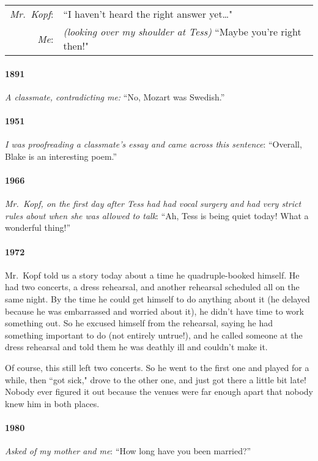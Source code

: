 \documentclass[10pt]{memoir}
\newcommand{\speakertag}[1]{\emph{#1}: }
\newcommand{\st}{\speakertag}
\newcommand{\intro}[1]{\emph{#1}}
\begin{document}
\noindent \begin{tabularx}{\textwidth}{r X}
  \st{Mr.\ Kopf} & ``I haven't heard the right answer yet\ldots "\\
  \st{Me} & \emph{(looking over my shoulder at Tess)} ``Maybe you're right then!"
\end{tabularx}

\paragraph{1891} \intro{A classmate, contradicting me:} ``No, Mozart was Swedish.''

\paragraph{1951} \intro{I was proofreading a classmate's essay and came across this sentence}: ``Overall, Blake is an interesting poem.''

\paragraph{1966} \intro{Mr.\ Kopf, on the first day after Tess had had vocal surgery and had very strict rules about when she was allowed to talk}: ``Ah, Tess is being quiet today! What a wonderful thing!''

\paragraph{1972} Mr.\ Kopf told us a story today about a time he quadruple-booked himself. He had two concerts, a dress rehearsal, and another rehearsal scheduled all on the same night. By the time he could get himself to do anything about it (he delayed because he was embarrassed and worried about it), he didn't have time to work something out. So he excused himself from the rehearsal, saying he had something important to do (not entirely untrue!), and he called someone at the dress rehearsal and told them he was deathly ill and couldn't make it.

Of course, this still left two concerts. So he went to the first one and played for a while, then ``got sick," drove to the other one, and just got there a little bit late! Nobody ever figured it out because the venues were far enough apart that nobody knew him in both places.

\paragraph{1980} \intro{Asked of my mother and me}: ``How long have you been married?''
\end{document}
